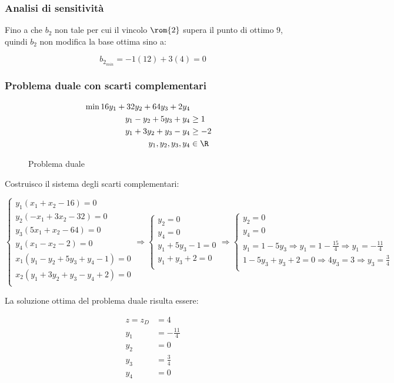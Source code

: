 \documentclass[\main/main.tex]{subfiles}
\begin{document}
\subsubsection*{Analisi di sensitività}
Fino a che $b_2$ non tale per cui il vincolo $\rom{2}$ supera il punto di ottimo $9$, quindi $b_2$ non modifica la base ottima sino a:

\[
  b_{2_{min}} = -1(12) + 3(4) = 0
\]

\subsubsection*{Problema duale con scarti complementari}

\begin{figure}
  \begin{align*}
    \min 16y_1 + 32y_2 + 64y_3 + 2y_4 \\
    y_1 -y_2 + 5y_3 + y_4 & \geq 1    \\
    y_1 +3y_2 + y_3 - y_4 & \geq -2   \\
    y_1, y_2, y_3, y_4    & \in \R
  \end{align*}
  \caption{Problema duale}
\end{figure}

Costruisco il sistema degli scarti complementari:

\[
  \begin{cases}
    y_1(x_1+x_2-16)=0              \\
    y_2(-x_1+3x_2-32)=0            \\
    y_3(5x_1+x_2-64)=0             \\
    y_4(x_1-x_2-2)=0               \\
    x_1(y_1 -y_2 + 5y_3 + y_4-1)=0 \\
    x_2(y_1 +3y_2 + y_3 - y_4+2)=0 \\
  \end{cases}
  \Rightarrow
  \begin{cases}
    y_2=0          \\
    y_4=0          \\
    y_1 + 5y_3-1=0 \\
    y_1 + y_3+2=0  \\
  \end{cases}
  \Rightarrow
  \begin{cases}
    y_2=0                                                                       \\
    y_4=0                                                                       \\
    y_1=1-5y_3 \Rightarrow y_1 = 1-\frac{15}{4} \Rightarrow y_1 = -\frac{11}{4} \\
    1-5y_3 + y_3+2=0 \Rightarrow 4y_3 = 3 \Rightarrow y_3 = \frac{3}{4}         \\
  \end{cases}
\]

La soluzione ottima del problema duale risulta essere:

\begin{align*}
  z = z_D & = 4             \\
  y_1     & = -\frac{11}{4} \\
  y_2     & = 0             \\
  y_3     & = \frac{3}{4}   \\
  y_4     & = 0             \\
\end{align*}
\end{document}
